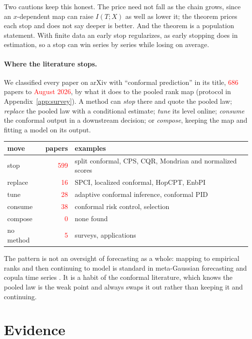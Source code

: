 \documentclass[11pt]{article}
\theoremstyle{definition}
\newcommand{\prov}[1]{\textcolor{red}{#1}}
\begin{document}
Two cautions keep this honest. The price need not fall as the chain grows, since an
$x$-dependent map can raise $I(T;X)$ as well as lower it; the theorem prices each stop and
does not say deeper is better. And the theorem is a population statement. With finite data
an early stop regularizes, as early stopping does in estimation, so a stop can win series by
series while losing on average.

\paragraph{Where the literature stops.} We classified every paper on arXiv with
``conformal prediction'' in its title, \prov{686} papers to \prov{August 2026}, by what it
does to the pooled rank map (protocol in Appendix~\ref{app:survey}). A method can
\emph{stop} there and quote the pooled law; \emph{replace} the pooled law with a conditional
estimate; \emph{tune} its level online; \emph{consume} the conformal output in a downstream
decision; or \emph{compose}, keeping the map and fitting a model on its output.
\begin{center}
\small
\begin{tabular}{lrl}
\toprule
move & papers & examples\\
\midrule
stop & \prov{599} & split conformal, CPS, CQR, Mondrian and normalized scores\\
replace & \prov{16} & SPCI, localized conformal, HopCPT, EnbPI\\
tune & \prov{28} & adaptive conformal inference, conformal PID\\
consume & \prov{38} & conformal risk control, selection\\
compose & \prov{0} & none found\\
no method & \prov{5} & surveys, applications\\
\bottomrule
\end{tabular}
\end{center}
The pattern is not an oversight of forecasting as a whole: mapping to empirical ranks and
then continuing to model is standard in meta-Gaussian forecasting and copula time series
\citep{bogner2012normal,chenfan2006}. It is a habit of the conformal literature, which knows
the pooled law is the weak point and always swaps it out rather than keeping it and
continuing.

\section{Evidence}\label{sec:evidence}
\end{document}
